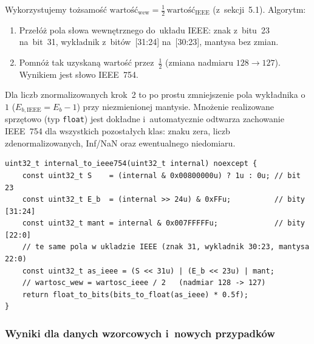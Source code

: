\documentclass[12pt,a4paper]{article}
\begin{document}
Wykorzystujemy tożsamość $\text{wartość}_{\text{wew}} = \tfrac{1}{2}\,\text{wartość}_{\text{IEEE}}$
(z~sekcji~5.1). Algorytm:
\begin{enumerate}[label=\arabic*.]
  \item Przełóż pola słowa wewnętrznego do~układu IEEE: znak z~bitu~23 na~bit~31,
        wykładnik z~bitów~[31:24] na~[30:23], mantysa bez zmian.
  \item Pomnóż tak uzyskaną wartość przez~$\tfrac{1}{2}$ (zmiana nadmiaru
        $128 \to 127$). Wynikiem jest słowo IEEE~754.
\end{enumerate}

Dla liczb znormalizowanych krok~2 to po prostu zmniejszenie pola wykładnika
o~$1$ ($E_{b,\text{IEEE}} = E_b - 1$) przy niezmienionej mantysie. Mnożenie
realizowane sprzętowo (typ \texttt{float}) jest dokładne i~automatycznie
odtwarza zachowanie IEEE~754 dla wszystkich pozostałych klas: znaku zera,
liczb zdenormalizowanych, Inf/NaN oraz ewentualnego niedomiaru.

\begin{lstlisting}
uint32_t internal_to_ieee754(uint32_t internal) noexcept {
    const uint32_t S    = (internal & 0x00800000u) ? 1u : 0u; // bit 23
    const uint32_t E_b  = (internal >> 24u) & 0xFFu;          // bity [31:24]
    const uint32_t mant = internal & 0x007FFFFFu;             // bity [22:0]
    // te same pola w ukladzie IEEE (znak 31, wykladnik 30:23, mantysa 22:0)
    const uint32_t as_ieee = (S << 31u) | (E_b << 23u) | mant;
    // wartosc_wew = wartosc_ieee / 2   (nadmiar 128 -> 127)
    return float_to_bits(bits_to_float(as_ieee) * 0.5f);
}
\end{lstlisting}

\subsubsection*{Wyniki dla danych wzorcowych i~nowych przypadków}
\end{document}
